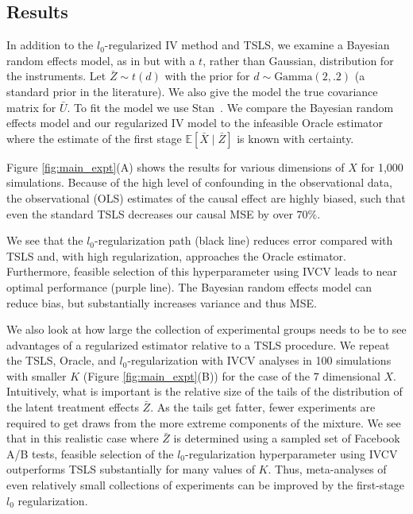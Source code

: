 \documentclass{article}
\newcommand\E{\mathbb{E}}
\begin{document}
\subsection{Results}
In addition to the $l_0$-regularized IV method and TSLS, we examine a Bayesian random effects model, as in \citet{chamberlain2004random} but with a $t$, rather than Gaussian, distribution for the instruments. Let $\bar{Z} \sim t(d)$ with the prior for $d \sim \text{Gamma}(2, .2)$ (a standard prior in the literature). We also give the model the true covariance matrix for $\bar{U}$. To fit the model we use Stan~\cite{carpenter2016stan}. We compare the Bayesian random effects model and our regularized IV model to the infeasible Oracle estimator where the estimate of the first stage $\E [\bar{X} \mid \bar{Z}]$ is known with certainty.

Figure \ref{fig:main_expt}(A) shows the results for various dimensions of $X$ for 1,000 simulations. Because of the high level of confounding in the observational data, the observational (OLS) estimates of the causal effect are highly biased, such that even the standard TSLS decreases our causal MSE by over $70\%.$ 

We see that the $l_0$-regularization path (black line) reduces error compared with TSLS and, with high regularization, approaches the Oracle estimator. Furthermore, feasible selection of this hyperparameter using IVCV leads to near optimal performance (purple line). The Bayesian random effects model can reduce bias, but substantially increases variance and thus MSE. 

We also look at how large the collection of experimental groups needs to be to see advantages of a regularized estimator relative to a TSLS procedure. We repeat the TSLS, Oracle, and $l_0$-regularization with IVCV analyses in 100 simulations with smaller $K$ (Figure \ref{fig:main_expt}(B)) for the case of the $7$ dimensional $X$. 
Intuitively, what is important is the relative size of the tails of the distribution of the latent treatment effects $\bar{Z}$. As the tails get fatter, fewer experiments are required to get draws from the more extreme components of the mixture. We see that in this realistic case where $\bar{Z}$ is determined using a sampled set of Facebook A/B tests, feasible selection of the $l_0$-regularization hyperparameter using IVCV outperforms TSLS substantially for many values of $K$. Thus, meta-analyses of even relatively small collections of experiments can be improved by the first-stage $l_0$ regularization.
\end{document}
